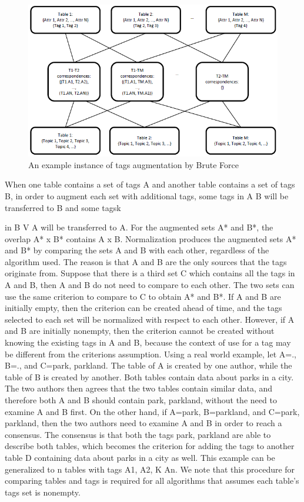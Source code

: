 \begin{figure}
    \centering
    \includegraphics[width=5in]{figures/an-example-instance-brute-force.png}
    \caption{An example instance of tags augmentation by Brute Force}
    \label{fig:an-example-instance-brute-force}
\end{figure}

When one table contains a set of tags A and another table contains a set of tags B, in order to augment each set with additional tags, some tags in A  B will be transferred to B and some tagsk

in B V A will be transferred to A. For the augmented sets A* and B*, the overlap A* x B* contains A x B. Normalization produces the augmented sets A* and B* by comparing the sets A and B with each other, regardless of the algorithm used. The reason is that A and B are the only sources that the tags originate from. Suppose that there is a third set C which contains all the tags in A and B, then A and B do not need to compare to each other. The two sets can use the same criterion to compare to C to obtain A* and B*. If A and B are initially empty, then the criterion can be created ahead of time, and the tags selected to each set will be normalized with respect to each other. However, if A and B are initially nonempty, then the criterion cannot be created without knowing the existing tags in A and B, because the context of use for a tag may be different from the criterions assumption.
Using a real world example, let A=., B=., and C={park, parkland}. The table of A is created by one author, while the table of B is created by another. Both tables contain data about parks in a city. The two authors then agrees that the two tables contain similar data, and therefore both A and B should contain {park, parkland}, without the need to examine A and B first. On the other hand, if A={park}, B={parkland}, and C={park, parkland}, then the two authors need to examine A and B in order to reach a consensus. The consensus is that both the tags park, parkland are able to describe both tables, which becomes the criterion for adding the tags to another table D containing data about parks in a city as well. This example can be generalized to n tables with tags A1, A2, K An.
We note that this procedure for comparing tables and tags is required for all algorithms that assumes each table's tags set is nonempty.

